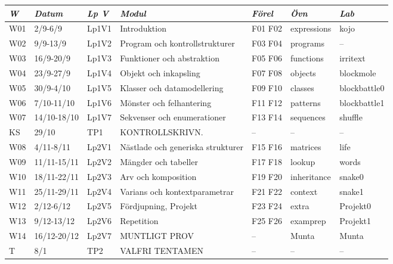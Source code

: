\begin{tabular}{l|l|l|l|l|l|l}
\textit{W} & \textit{Datum} & \textit{Lp V} & \textit{Modul} & \textit{Förel} & \textit{Övn} & \textit{Lab} \\ \hline \hline
W01 & 2/9-6/9 & Lp1V1 & Introduktion & F01 F02 & expressions & kojo \\
W02 & 9/9-13/9 & Lp1V2 & Program och kontrollstrukturer & F03 F04 & programs & -- \\
W03 & 16/9-20/9 & Lp1V3 & Funktioner och abstraktion & F05 F06 & functions & irritext \\
W04 & 23/9-27/9 & Lp1V4 & Objekt och inkapsling & F07 F08 & objects & blockmole \\
W05 & 30/9-4/10 & Lp1V5 & Klasser och datamodellering & F09 F10 & classes & blockbattle0 \\
W06 & 7/10-11/10 & Lp1V6 & Mönster och felhantering & F11 F12 & patterns & blockbattle1 \\
W07 & 14/10-18/10 & Lp1V7 & Sekvenser och enumerationer & F13 F14 & sequences & shuffle \\
KS & 29/10 & TP1 & KONTROLLSKRIVN. & -- & -- & -- \\
W08 & 4/11-8/11 & Lp2V1 & Nästlade och generiska strukturer & F15 F16 & matrices & life \\
W09 & 11/11-15/11 & Lp2V2 & Mängder och tabeller & F17 F18 & lookup & words \\
W10 & 18/11-22/11 & Lp2V3 & Arv och komposition & F19 F20 & inheritance & snake0 \\
W11 & 25/11-29/11 & Lp2V4 & Varians och kontextparametrar & F21 F22 & context & snake1 \\
W12 & 2/12-6/12 & Lp2V5 & Fördjupning, Projekt & F23 F24 & extra & Projekt0 \\
W13 & 9/12-13/12 & Lp2V6 & Repetition & F25 F26 & examprep & Projekt1 \\
W14 & 16/12-20/12 & Lp2V7 & MUNTLIGT PROV & -- & Munta & Munta \\
T & 8/1 & TP2 & VALFRI TENTAMEN & -- & -- & -- \\
\end{tabular}
